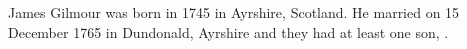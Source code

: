 
James Gilmour was born in 1745 in Ayrshire, Scotland.\cite{JGbirth}
He married  on 15 December 1765 in Dundonald, Ayrshire and they had at least one son, .
